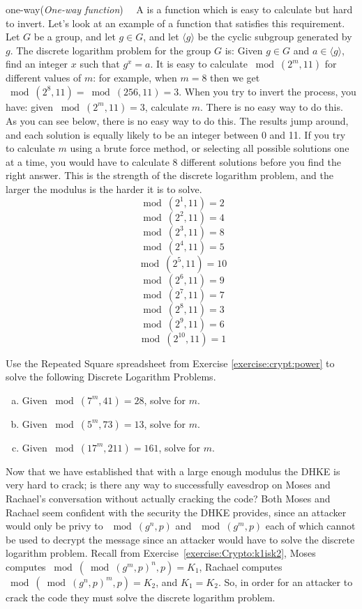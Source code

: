\begin{example}{one-way}(\emph{One-way function})~~
A  is a function which is easy to calculate but hard to invert.  Let's look at an example of a function that satisfies this requirement. Let $G$ be a group, and let $g \in G$, and let $\langle g \rangle$ be the cyclic subgroup generated by $g$.  The discrete logarithm problem for the group $G$ is: Given $g \in G$ and $a \in \langle g \rangle$, find an integer $x$ such that $g^{x}=a$.
It is easy to calculate $\bmod(2^{m},  11)$ for different values of $m$: for example, when $m =8$ then we get $\bmod(2^{8},  11) =\bmod(256,  11)  = 3$.  When you try to invert the process, you have: given $\bmod(2^{m},  11) = 3$, calculate $m$. There is no easy way to do this. As you can see below, there is no easy way to do this.  The results jump around, and each solution is equally likely to be an integer between 0 and 11. If you try to calculate $m$ using a brute force method, or selecting all possible solutions one at a time, you would have to calculate 8 different solutions before you find the right answer. This is the strength of the discrete logarithm problem, and the larger the modulus is the harder it is to solve.
$$ \bmod(2^{1}, 11)=2$$
$$ \bmod(2^{2}, 11)=4$$
$$ \bmod(2^{3}, 11)=8$$
$$ \bmod(2^{4}, 11)=5$$
$$ \bmod(2^{5}, 11)=10$$
$$ \bmod(2^{6}, 11)=9$$
$$ \bmod(2^{7}, 11)=7$$
$$ \bmod(2^{8}, 11)=3$$
$$ \bmod(2^{9}, 11)=6$$
$$ \bmod(2^{10}, 11)=1$$
\end{example}
\begin{exer}
Use the Repeated Square spreadsheet from Exercise \ref{exercise:crypt:power} to solve the following Discrete Logarithm Problems.  
\begin{enumerate}[(a)]
\item Given $ \bmod(7^{m}, 41)=28$, solve for $m$.

\item Given $ \bmod(5^{m}, 73)=13$, solve for $m$.

\item Given $ \bmod(17^{m}, 211)=161$, solve for $m$.
\end{enumerate}
\end{exer}
Now that we have established that with a large enough modulus the DHKE is very hard to crack; is there any way to successfully eavesdrop on Moses and Rachael's conversation without actually cracking the code?  Both Moses and Rachael seem confident with the security the DHKE provides, since an attacker would only be privy to $\mod (g^n , p)$ and $\mod (g^m , p)$ each of which cannot be used to decrypt the message since an attacker would have to solve the discrete logarithm problem. Recall from Exercise~\ref{exercise:Crypto:k1isk2}, Moses computes $ \bmod ( \bmod (g^m , p)^n , p ) = K_1$, Rachael computes $ \bmod (\bmod (g^n , p)^m , p ) = K_2$, and $K_1 = K_2$. So, in order for an attacker to crack the code they must solve the discrete logarithm problem.

